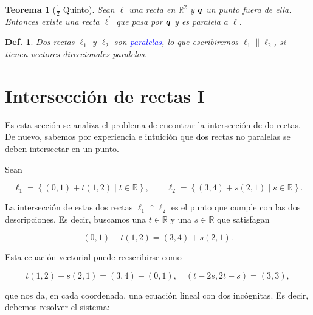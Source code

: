 \documentclass{article}
\theoremstyle{definicion}
\newtheorem{definicion}{Def.}
\theoremstyle{definition}             %
\theoremstyle{definition}             %
\theoremstyle{definition}
\theoremstyle{definition}
\theoremstyle{observacion}
\theoremstyle{definition}
\theoremstyle{plain}
\newtheorem{theorem}{Teorema}
\theoremstyle{definition}
\theoremstyle{afirmacion}
\theoremstyle{notation}
\theoremstyle{definition}
\begin{document}
        \begin{theorem}[\(\frac{1}{2}\) Quinto]
            Sean \(\ell\) una recta en \(\mathbb{R}^{2}\) y \(\vb*{q}\) un punto fuera de ella. Entonces existe una recta \(\ell^{\prime}\) que pasa por \(\vb*{q}\) y es paralela a \(\ell\).
        \end{theorem}

        \begin{definicion}
            Dos rectas \(\ell_{1}\) y \(\ell_{2}\) son \textcolor{blue}{paralelas}, lo que escribiremos \(\ell_{1} \parallel \ell_{2}\), si tienen vectores direccionales paralelos.
        \end{definicion}

        \section{Intersección de rectas I}

        Es esta sección se analiza el problema de encontrar la intersección de do rectas. De nuevo, sabemos por experiencia e intuición que dos rectas no paralelas se deben intersectar en un punto. 

        Sean 

        \begin{equation*}
            \ell_{1} = \left\lbrace (0, 1) + t(1, 2) \mid t \in \mathbb{R}\right\rbrace,\qquad \ell_{2} = \left\lbrace (3, 4) + s(2, 1) \mid s \in \mathbb{R}\right\rbrace.
        \end{equation*}

        La intersección de estas dos rectas \(\ell_{1} \cap \ell_{2}\) es el punto que cumple con las dos descripciones. Es decir, buscamos una \(t \in \mathbb{R}\) y una \(s \in \mathbb{R}\) que satisfagan 

        \begin{equation*}
            (0, 1) + t(1, 2) = (3, 4) + s(2, 1).
        \end{equation*}

        Esta ecuación vectorial puede reescribirse como

        \begin{equation*}
            t(1, 2) - s(2, 1) = (3, 4) - (0, 1), \quad (t -2s, 2t - s) = (3, 3),
        \end{equation*}

        que nos da, en cada coordenada, una ecuación lineal con dos incógnitas. Es decir, debemos resolver el sistema:
        
\end{document}
